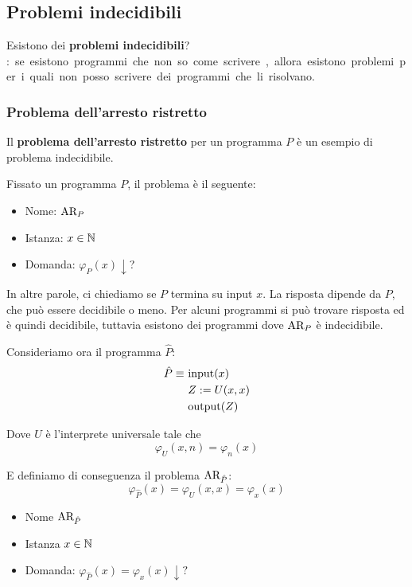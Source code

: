 \vspace{-0.25em}

\subsection{Problemi indecidibili}

Esistono dei \textbf{problemi indecidibili}? \si: se esistono programmi che non so come scrivere, allora esistono problemi per i quali non posso scrivere dei programmi che li risolvano.

\subsubsection{Problema dell'arresto ristretto}

Il \textbf{problema dell'arresto ristretto} per un programma $P$ è un esempio di problema indecidibile. 

Fissato un programma $P$, il problema è il seguente:
\begin{itemize}
	\item Nome: $\text{AR}_P$

	\item Istanza: $x \in \mathbb{N}$

	\item Domanda: $\varphi_P (x) \downarrow$?
\end{itemize}

In altre parole, ci chiediamo se $P$ termina su input $x$. La risposta dipende da $P$, che può essere decidibile o meno. Per alcuni programmi si può trovare risposta ed è quindi decidibile, tuttavia esistono dei programmi dove $\text{AR}_P$ è indecidibile.

Consideriamo ora il programma $\hat{P}$:
\begin{align}
	\hat{P} \equiv\ & \text{input($x$)}       \notag\\
	& Z := U(x,x)                             \notag\\
	& \text{output($Z$)}                      \notag
\end{align}

Dove $U$ è l'interprete universale tale che
$$ \varphi_U (x,n) = \varphi_n (x) $$

E definiamo di conseguenza il problema $\text{AR}_{\hat{P}}$:
$$ \varphi_{\hat{P}}(x) = \varphi_{U}(x,x) = \varphi_{x}(x) $$
\begin{itemize}
	\item Nome $\text{AR}_{\hat{P}}$
	
    \item Istanza $ x \in \mathbb{N}$
	
    \item Domanda: $\varphi_{\hat{P}}(x) = \varphi_x(x) \downarrow ?$
\end{itemize}

